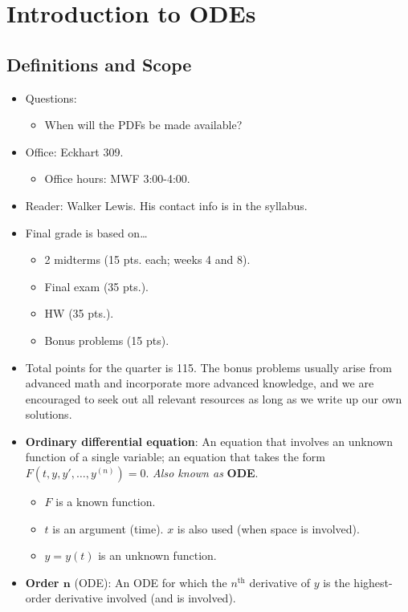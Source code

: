 \documentclass[../notes.tex]{subfiles}
\begin{document}
\chapter{Introduction to ODEs}
\section{Definitions and Scope}
\begin{itemize}
    \item {}Questions:
    \begin{itemize}
        \item When will the PDFs be made available?
    \end{itemize}
    \item Office: Eckhart 309.
    \begin{itemize}
        \item Office hours: MWF 3:00-4:00.
    \end{itemize}
    \item Reader: Walker Lewis. His contact info is in the syllabus.
    \item Final grade is based on\dots
    \begin{itemize}
        \item 2 midterms (15 pts. each; weeks 4 and 8).
        \item Final exam (35 pts.).
        \item HW (35 pts.).
        \item Bonus problems (15 pts).
    \end{itemize}
    \item Total points for the quarter is 115. The bonus problems usually arise from advanced math and incorporate more advanced knowledge, and we are encouraged to seek out all relevant resources as long as we write up our own solutions.
    \item \textbf{Ordinary differential equation}: An equation that involves an unknown function of a single variable; an equation that takes the form $F(t,y,y',\dots,y^{(n)})=0$. \emph{Also known as} \textbf{ODE}.
    \begin{itemize}
        \item $F$ is a known function.
        \item $t$ is an argument (time). $x$ is also used (when space is involved).
        \item $y=y(t)$ is an unknown function.
    \end{itemize}
    \item \textbf{Order $\bm{n}$} (ODE): An ODE for which the $n^\text{th}$ derivative of $y$ is the highest-order derivative involved (and is involved).

\end{itemize}
\end{document}
